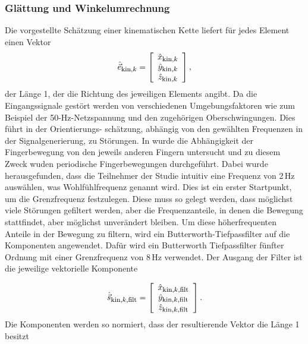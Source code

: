 \subsubsection{Glättung und Winkelumrechnung}
\label{subsubsection:Glattung_kin}

Die vorgestellte Schätzung einer kinematischen Kette liefert für jedes Element einen Vektor 
\begin{equation}
    \hat{\vec{e}}_{\textrm{\footnotesize{kin,$k$}}} = \left[\begin{array}{c} \hat{x}_{\textrm{\footnotesize{kin,$k$}}}\\ \hat{y}_{\textrm{\footnotesize{kin,$k$}}} \\ \hat{z}_{\textrm{\footnotesize{kin,$k$}}} \end{array}\right], 
\end{equation}
der Länge 1, der die Richtung des jeweiligen Elements angibt. 
Da die Eingangssignale gestört werden von verschiedenen Umgebungsfaktoren wie zum Beispiel der 50-Hz-Netzspannung und den zugehörigen Oberschwingungen. Dies führt in der Orientierungs- schätzung, abhängig von den gewählten Frequenzen in der Signalgenerierung, zu Störungen. In \cite{hager-ross_quantifying_2000} wurde die Abhängigkeit der Fingerbewegung von den jeweils anderen Fingern untersucht und zu diesem Zweck wuden periodische Fingerbewegungen durchgeführt. Dabei wurde herausgefunden, dass die Teilnehmer der Studie intuitiv eine Frequenz von 2\,Hz auswählen, was Wohlfühlfrequenz genannt wird. Dies ist ein erster Startpunkt, um die Grenzfrequenz festzulegen. Diese muss so gelegt werden, dass möglichst viele Störungen gefiltert werden, aber die Frequenzanteile, in denen die Bewegung stattfindet, aber möglichst unverändert bleiben. Um diese höherfrequenten Anteile in der Bewegung zu filtern, wird ein Butterworth-Tiefpassfilter auf die Komponenten angewendet. Dafür wird ein Butterworth Tiefpassfilter fünfter Ordnung mit einer Grenzfrequenz von 8\,Hz verwendet. Der Ausgang der Filter ist die jeweilige vektorielle Komponente

\begin{equation}
    \hat{\vec{s}}_{\textrm{\footnotesize{kin,$k$,filt}}} = \left[\begin{array}{c} \hat{x}_{\textrm{\footnotesize{kin,$k$,filt}}}\\ \hat{y}_{\textrm{\footnotesize{kin,$k$,filt}}} \\ \hat{z}_{\textrm{\footnotesize{kin,$k$,filt}}} \end{array}\right].
\end{equation}
 Die Komponenten werden so normiert, dass der resultierende Vektor die Länge 1 besitzt

